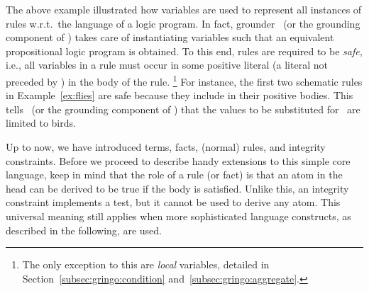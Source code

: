 The above example illustrated how variables are used to represent all instances of
rules w.r.t.\ the language of a logic program.
In fact, grounder \gringo\ (or the grounding component of \clingo)
takes care of instantiating variables
such that an equivalent propositional logic program is obtained.
To this end,
rules are required to be \emph{safe}, 
\label{pg:safe}%
%
i.e.,
all variables in a rule must occur in some positive literal
(a literal not preceded by ) in the body of the rule.%
\footnote{%
The only exception to this are \emph{local} variables, %
detailed in Section~\ref{subsec:gringo:condition} and~\ref{subsec:gringo:aggregate}.} 
For instance, the first two schematic rules in Example~\ref{ex:flies} 
are safe because they include  in their positive bodies.
This tells \gringo\ (or the grounding component of \clingo)
that the values to be substituted for~ are limited to birds.


Up to now, we have introduced terms, facts, (normal) rules, and integrity constraints.
Before we proceed to describe handy extensions to this simple core language,
keep in mind that the role of a rule (or fact) is that an atom in the
head can be derived to be true if the body is satisfied.
Unlike this, an integrity constraint implements a test,
but it cannot be used to derive any atom.
This universal meaning still applies when more sophisticated language constructs,
as described in the following, are used.

